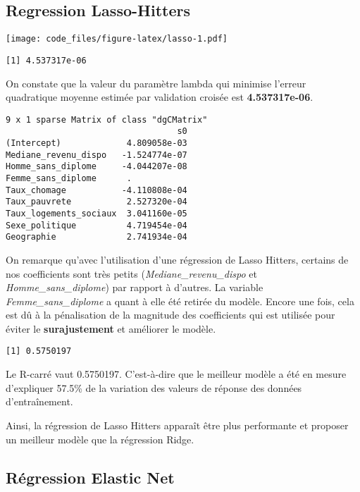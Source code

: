 \documentclass[
]{article}
\begin{document}
\hypertarget{regression-lasso-hitters}{%
\subsection{Regression Lasso-Hitters}\label{regression-lasso-hitters}}

\texttt{[image: code\_files/figure-latex/lasso-1.pdf]}

\begin{verbatim}
[1] 4.537317e-06
\end{verbatim}

On constate que la valeur du paramètre lambda qui minimise l'erreur
quadratique moyenne estimée par validation croisée est
\textbf{4.537317e-06}.

\begin{verbatim}
9 x 1 sparse Matrix of class "dgCMatrix"
                                  s0
(Intercept)             4.809058e-03
Mediane_revenu_dispo   -1.524774e-07
Homme_sans_diplome     -4.044207e-08
Femme_sans_diplome      .           
Taux_chomage           -4.110808e-04
Taux_pauvrete           2.527320e-04
Taux_logements_sociaux  3.041160e-05
Sexe_politique          4.719454e-04
Geographie              2.741934e-04
\end{verbatim}

On remarque qu'avec l'utilisation d'une régression de Lasso Hitters,
certains de nos coefficients sont très petits
(\emph{Mediane\_revenu\_dispo} et \emph{Homme\_sans\_diplome}) par
rapport à d'autres. La variable \emph{Femme\_sans\_diplome} a quant à
elle été retirée du modèle. Encore une fois, cela est dû à la
pénalisation de la magnitude des coefficients qui est utilisée pour
éviter le \textbf{surajustement} et améliorer le modèle.

\begin{verbatim}
[1] 0.5750197
\end{verbatim}

Le R-carré vaut 0.5750197. C'est-à-dire que le meilleur modèle a été en
mesure d'expliquer 57.5\% de la variation des valeurs de réponse des
données d'entraînement.

Ainsi, la régression de Lasso Hitters apparaît être plus performante et
proposer un meilleur modèle que la régression Ridge.

\hypertarget{ruxe9gression-elastic-net}{%
\subsection{Régression Elastic Net}\label{ruxe9gression-elastic-net}}
\end{document}
